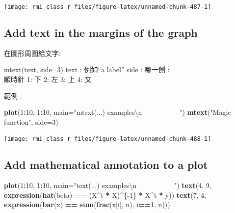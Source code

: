 \documentclass[]{book}
\newenvironment{Shaded}{\begin{snugshade}}{\end{snugshade}}
\newcommand{\CharTok}[1]{\textcolor[rgb]{0.31,0.60,0.02}{#1}}
\newcommand{\DataTypeTok}[1]{\textcolor[rgb]{0.13,0.29,0.53}{#1}}
\newcommand{\DecValTok}[1]{\textcolor[rgb]{0.00,0.00,0.81}{#1}}
\newcommand{\KeywordTok}[1]{\textcolor[rgb]{0.13,0.29,0.53}{\textbf{#1}}}
\newcommand{\NormalTok}[1]{#1}
\newcommand{\OperatorTok}[1]{\textcolor[rgb]{0.81,0.36,0.00}{\textbf{#1}}}
\newcommand{\StringTok}[1]{\textcolor[rgb]{0.31,0.60,0.02}{#1}}
\theoremstyle{definition}
\theoremstyle{definition}
\theoremstyle{definition}
\theoremstyle{remark}
\begin{document}
\begin{center}\texttt{[image: rmi\_class\_r\_files/figure-latex/unnamed-chunk-487-1]} \end{center}

\hypertarget{add-text-in-the-margins-of-the-graph}{%
\subsection{Add text in the margins of the
graph}\label{add-text-in-the-margins-of-the-graph}}

在圖形周圍給文字:

mtext(text, side=3) text : 例如``a label'' side : 哪一側 :\\
順時針 1: 下 2: 左 3: 上 4: 又

範例 :

\begin{Shaded}
\begin{Highlighting}[]
\KeywordTok{plot}\NormalTok{(}\DecValTok{1}\OperatorTok{:}\DecValTok{10}\NormalTok{, }\DecValTok{1}\OperatorTok{:}\DecValTok{10}\NormalTok{, }
     \DataTypeTok{main=}\StringTok{"mtext(...) examples}\CharTok{\textbackslash{}n}\StringTok{~~~~~~~~~~~"}\NormalTok{)}
\KeywordTok{mtext}\NormalTok{(}\StringTok{"Magic function"}\NormalTok{, }\DataTypeTok{side=}\DecValTok{3}\NormalTok{)}
\end{Highlighting}
\end{Shaded}

\begin{center}\texttt{[image: rmi\_class\_r\_files/figure-latex/unnamed-chunk-488-1]} \end{center}

\hypertarget{add-mathematical-annotation-to-a-plot}{%
\subsection{Add mathematical annotation to a
plot}\label{add-mathematical-annotation-to-a-plot}}

\begin{Shaded}
\begin{Highlighting}[]
\KeywordTok{plot}\NormalTok{(}\DecValTok{1}\OperatorTok{:}\DecValTok{10}\NormalTok{, }\DecValTok{1}\OperatorTok{:}\DecValTok{10}\NormalTok{, }
     \DataTypeTok{main=}\StringTok{"text(...) examples}\CharTok{\textbackslash{}n}\StringTok{~~~~~~~~~~~"}\NormalTok{)}
\KeywordTok{text}\NormalTok{(}\DecValTok{4}\NormalTok{, }\DecValTok{9}\NormalTok{, }\KeywordTok{expression}\NormalTok{(}\KeywordTok{hat}\NormalTok{(beta) }\OperatorTok{==}\StringTok{ }\NormalTok{(X}\OperatorTok{^}\NormalTok{t }\OperatorTok{*}\StringTok{ }\NormalTok{X)}\OperatorTok{^}\NormalTok{\{}\OperatorTok{-}\DecValTok{1}\NormalTok{\} }\OperatorTok{*}\StringTok{ }\NormalTok{X}\OperatorTok{^}\NormalTok{t }\OperatorTok{*}\StringTok{ }\NormalTok{y))}
\KeywordTok{text}\NormalTok{(}\DecValTok{7}\NormalTok{, }\DecValTok{4}\NormalTok{, }\KeywordTok{expression}\NormalTok{(}\KeywordTok{bar}\NormalTok{(x) }\OperatorTok{==}\StringTok{ }\KeywordTok{sum}\NormalTok{(}\KeywordTok{frac}\NormalTok{(x[i], n), i}\OperatorTok{==}\DecValTok{1}\NormalTok{, n)))}
\end{Highlighting}
\end{Shaded}
\end{document}
